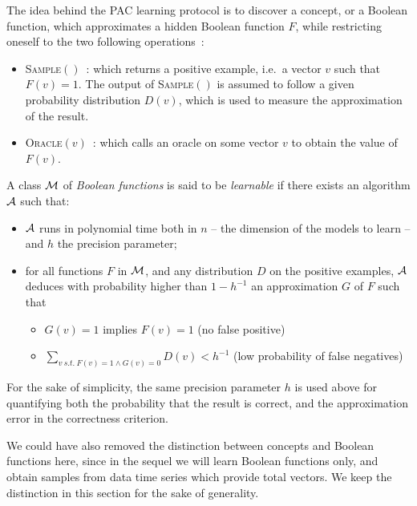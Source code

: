 \documentclass{llncs}
\begin{document}
The idea behind the PAC learning protocol is to discover a concept, or a Boolean function, which approximates a hidden Boolean function $F$, while restricting oneself to the two following operations~:
\begin{itemize}
  \item
\textsc{Sample}$()$~: which returns a positive example, i.e.~a vector $v$ such that $F(v)=1$. 
The output of \textsc{Sample}$()$ is assumed to follow a given probability distribution $D(v)$, which is used to measure the approximation of the result.
  \item
\textsc{Oracle}$(v)$~: which calls an oracle on some vector $v$ to obtain the value of $F(v)$.
\end{itemize}


\begin{definition}
	\label{def:learnclass}
   A class $\cal M$ of \emph{Boolean functions} is said to be \emph{learnable}
   if there exists an algorithm $\cal A$ such that:
   \begin{itemize}
      \item $\cal A$ runs in polynomial time both in $n$ -- the dimension of the models to learn -- and $h$ the precision parameter;
      \item
         for all functions $F$ in $\cal M$, and any distribution $D$ on the positive examples, %
         $\cal A$ deduces with probability higher than $1-h^{-1}$ an approximation $G$ of $F$ such that
         \begin{itemize}
            \item $G(v)=1$ implies $F(v)=1$ (no false positive)
            \item
               $\displaystyle\sum_{v\ s.t.\ F(v)=1\wedge G(v)=0} D(v) < h^{-1}$ (low probability of false negatives)
         \end{itemize}
   \end{itemize}
\end{definition}

For the sake of simplicity, the same precision parameter $h$ is used above for quantifying both the probability that the result is correct,
and the approximation error in the correctness criterion.

We could have also removed the distinction between concepts and Boolean functions here,
since in the sequel we will learn Boolean functions only, and obtain samples from data time series which provide total vectors.
We keep the distinction in this section for the sake of generality.
\end{document}
